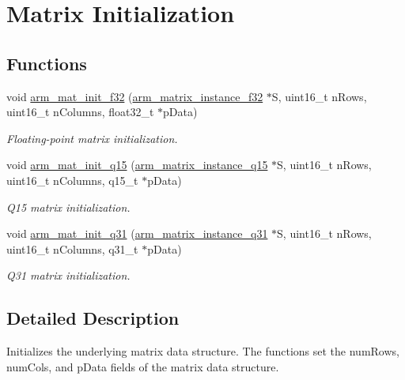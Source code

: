 \hypertarget{group___matrix_init}{\section{Matrix Initialization}
\label{group___matrix_init}
}
\subsection*{Functions}
\begin{DoxyCompactItemize}
\item 
void \hyperlink{group___matrix_init_ga11e3dc41592a6401c13182fef9416a27}{arm\-\_\-mat\-\_\-init\-\_\-f32} (\hyperlink{structarm__matrix__instance__f32}{arm\-\_\-matrix\-\_\-instance\-\_\-f32} $\ast$S, uint16\-\_\-t n\-Rows, uint16\-\_\-t n\-Columns, float32\-\_\-t $\ast$p\-Data)
\begin{DoxyCompactList}\small\item\em Floating-\/point matrix initialization. \end{DoxyCompactList}\item 
void \hyperlink{group___matrix_init_ga31a7c2b991803d49719393eb2d53dc26}{arm\-\_\-mat\-\_\-init\-\_\-q15} (\hyperlink{structarm__matrix__instance__q15}{arm\-\_\-matrix\-\_\-instance\-\_\-q15} $\ast$S, uint16\-\_\-t n\-Rows, uint16\-\_\-t n\-Columns, q15\-\_\-t $\ast$p\-Data)
\begin{DoxyCompactList}\small\item\em Q15 matrix initialization. \end{DoxyCompactList}\item 
void \hyperlink{group___matrix_init_ga48a5e5d37e1f062cc57fcfaf683343cc}{arm\-\_\-mat\-\_\-init\-\_\-q31} (\hyperlink{structarm__matrix__instance__q31}{arm\-\_\-matrix\-\_\-instance\-\_\-q31} $\ast$S, uint16\-\_\-t n\-Rows, uint16\-\_\-t n\-Columns, q31\-\_\-t $\ast$p\-Data)
\begin{DoxyCompactList}\small\item\em Q31 matrix initialization. \end{DoxyCompactList}\end{DoxyCompactItemize}


\subsection{Detailed Description}
Initializes the underlying matrix data structure. The functions set the {\ttfamily num\-Rows}, {\ttfamily num\-Cols}, and {\ttfamily p\-Data} fields of the matrix data structure. 

